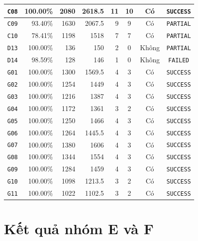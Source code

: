 \documentclass[../DoAn.tex]{subfiles}
\begin{document}
\begin{table}[H]
{\begin{tabular}{|c|r|r|r|r|c|c|c|}
\hline
\texttt{C08} & 100.00\% & 2080 & 2618.5 & 11 & 10 & Có & \texttt{SUCCESS} \\
\hline
\texttt{C09} & 93.40\% & 1630 & 2067.5 & 9 & 9 & Có & \texttt{PARTIAL} \\
\hline
\texttt{C10} & 78.41\% & 1198 & 1518 & 7 & 7 & Có & \texttt{PARTIAL} \\
\hline
\texttt{D13} & 100.00\% & 136 & 150 & 2 & 0 & Không & \texttt{PARTIAL} \\
\hline
\texttt{D14} & 98.59\% & 128 & 146 & 1 & 0 & Không & \texttt{FAILED} \\
\hline
\texttt{G01} & 100.00\% & 1300 & 1569.5 & 4 & 3 & Có & \texttt{SUCCESS} \\
\hline
\texttt{G02} & 100.00\% & 1254 & 1449 & 4 & 3 & Có & \texttt{SUCCESS} \\
\hline
\texttt{G03} & 100.00\% & 1216 & 1387 & 4 & 3 & Có & \texttt{SUCCESS} \\
\hline
\texttt{G04} & 100.00\% & 1172 & 1361 & 3 & 2 & Có & \texttt{SUCCESS} \\
\hline
\texttt{G05} & 100.00\% & 1250 & 1466 & 4 & 3 & Có & \texttt{SUCCESS} \\
\hline
\texttt{G06} & 100.00\% & 1264 & 1445.5 & 4 & 3 & Có & \texttt{SUCCESS} \\
\hline
\texttt{G07} & 100.00\% & 1380 & 1606 & 4 & 3 & Có & \texttt{SUCCESS} \\
\hline
\texttt{G08} & 100.00\% & 1344 & 1554 & 4 & 3 & Có & \texttt{SUCCESS} \\
\hline
\texttt{G09} & 100.00\% & 1284 & 1459 & 4 & 3 & Có & \texttt{SUCCESS} \\
\hline
\texttt{G10} & 100.00\% & 1098 & 1213.5 & 3 & 2 & Có & \texttt{SUCCESS} \\
\hline
\texttt{G11} & 100.00\% & 1022 & 1102.5 & 3 & 2 & Có & \texttt{SUCCESS} \\
\hline
\end{tabular}%
}
\end{table}

\section{Kết quả nhóm E và F}
\end{document}
